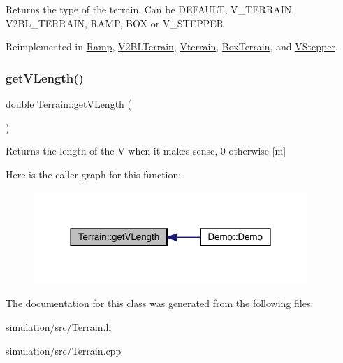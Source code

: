 \begin{DoxyReturn}{Returns}
the type of the terrain. Can be D\+E\+F\+A\+U\+LT, V\+\_\+\+T\+E\+R\+R\+A\+IN, V2\+B\+L\+\_\+\+T\+E\+R\+R\+A\+IN, R\+A\+MP, B\+OX or V\+\_\+\+S\+T\+E\+P\+P\+ER 
\end{DoxyReturn}


Reimplemented in \mbox{\hyperlink{class_ramp_a25dce9bce336a8524be1de1abd6f1af3}{Ramp}}, \mbox{\hyperlink{class_v2_b_l_terrain_a4ac0574a992aadd7cfcad6eba6b55000}{V2\+B\+L\+Terrain}}, \mbox{\hyperlink{class_vterrain_abf5de57e84f4aac4f7cdb5c4f3e37b6a}{Vterrain}}, \mbox{\hyperlink{class_box_terrain_a8056b743b0cc1fbd38e742f542dfa34b}{Box\+Terrain}}, and \mbox{\hyperlink{class_v_stepper_a9621c3cbd705479e32baf9671983cb8b}{V\+Stepper}}.

\mbox{\label{class_terrain_a819253da1f67d199b6347b93071961e7}} 
\subsubsection{\texorpdfstring{get\+V\+Length()}{getVLength()}}
{\footnotesize\ttfamily double Terrain\+::get\+V\+Length (\begin{DoxyParamCaption}{ }\end{DoxyParamCaption})\hspace{0.3cm}{\ttfamily [inline]}}

\begin{DoxyReturn}{Returns}
the length of the V when it makes sense, 0 otherwise \mbox{[}m\mbox{]} 
\end{DoxyReturn}
Here is the caller graph for this function\+:\nopagebreak
\begin{figure}[H]
\begin{center}
\leavevmode
\includegraphics[width=294pt]{class_terrain_a819253da1f67d199b6347b93071961e7_icgraph}
\end{center}
\end{figure}


The documentation for this class was generated from the following files\+:\begin{DoxyCompactItemize}
\item 
simulation/src/\mbox{\hyperlink{_terrain_8h}{Terrain.\+h}}\item 
simulation/src/Terrain.\+cpp\end{DoxyCompactItemize}
